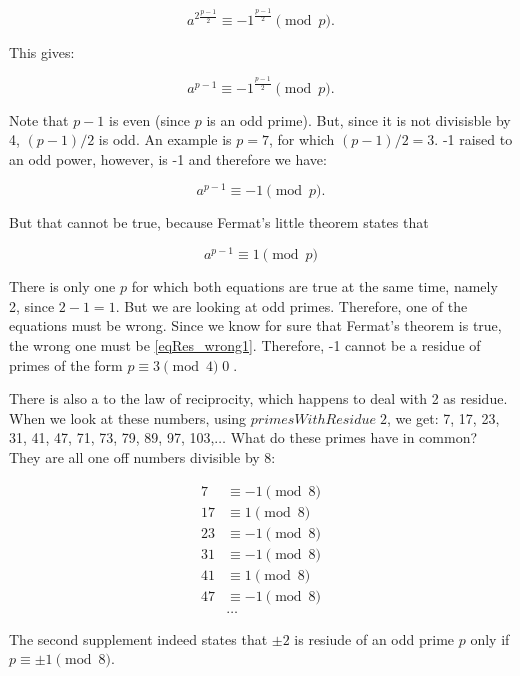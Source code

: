 \documentclass{scrreprt}
\newcommand{\Varid}[1]{\mathit{#1}}
\begin{document}
\begin{equation}
a^{2\frac{p-1}{2}} \equiv -1^{\frac{p-1}{2}} \pmod{p}.
\end{equation}

This gives:

\begin{equation}
a^{p-1} \equiv -1^{\frac{p-1}{2}} \pmod{p}.
\end{equation} 

Note that $p-1$ is even (since $p$ is an odd prime).
But, since it is not divisisble by 4, $(p-1)/2$ is odd.
An example is $p = 7$, for which $(p-1)/2 = 3$.
-1 raised to an odd power, however, is -1
and therefore we have:

\begin{equation}\label{eqRes_wrong1}
a^{p-1} \equiv -1 \pmod{p}.
\end{equation}

But that cannot be true, because Fermat's little theorem states
that 

\begin{equation}
a^{p-1} \equiv 1 \pmod{p}
\end{equation}

There is only one $p$ for which both equations
are true at the same time, namely 2, since $2-1=1$.
But we are looking at odd primes.
Therefore, one of the equations must be wrong.
Since we know for sure that Fermat's theorem is true,
the wrong one must be \ref{eqRes_wrong1}.
Therefore, -1 cannot be a residue of primes of the form
$p \equiv 3 \pmod{4}$\qed.

There is also a  to 
the law of reciprocity, which happens to deal
with 2 as residue. When we look at these numbers,
using \ensuremath{\Varid{primesWithResidue}\;\mathrm{2}}, we get:
7, 17, 23, 31, 41, 47, 71, 73, 79, 89, 97, 103,$\dots$
What do these primes have in common?
They are all one off numbers divisible by 8:

\begin{align*}
7  & \equiv -1 \pmod{8}\\
17 & \equiv  1 \pmod{8}\\
23 & \equiv -1 \pmod{8}\\
31 & \equiv -1 \pmod{8}\\
41 & \equiv  1 \pmod{8}\\
47 & \equiv -1 \pmod{8}\\
   & \dots
\end{align*}

The second supplement indeed states
that $\pm 2$ is resiude of an odd prime $p$
only if $p \equiv \pm 1 \pmod{8}$.
\end{document}
